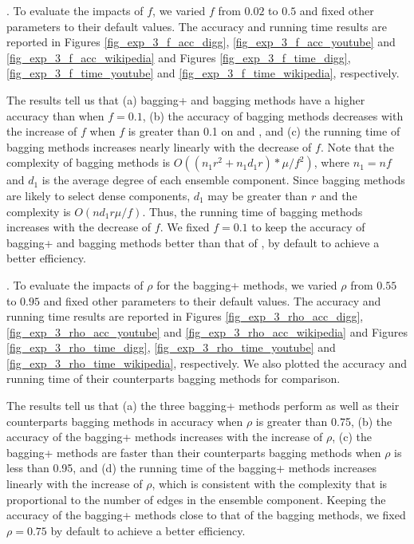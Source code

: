 . To evaluate the impacts of $f$, we
varied $f$ from $0.02$ to $0.5$ and fixed other parameters to their
default values. The accuracy and running time results are reported in
Figures \ref{fig_exp_3_f_acc_digg}, \ref{fig_exp_3_f_acc_youtube} and \ref{fig_exp_3_f_acc_wikipedia} and
Figures \ref{fig_exp_3_f_time_digg}, \ref{fig_exp_3_f_time_youtube} and \ref{fig_exp_3_f_time_wikipedia}, respectively.



The results tell us that (a) bagging+ and bagging methods have a higher accuracy
than \NMF when $f = 0.1$, (b) the accuracy of bagging methods decreases
with the increase of $f$ when $f$ is greater than 0.1 on \Digg and \Wikipedia,
and (c) the running time of bagging methods increases
nearly linearly with the decrease of $f$. Note that the complexity of bagging methods is
$O((n_{1}r^2 + n_{1}d_{1}r)*\mu /f^2)$, where $n_1 = nf$ and $d_1$ is the average degree of
each ensemble component. Since bagging methods are likely to select dense components, $d_1$
may be greater than $r$ and the complexity is $O(nd_1r\mu /f)$. Thus, the running time
of bagging methods increases with the decrease of $f$. We fixed $f = 0.1$ to keep the accuracy of bagging+ and bagging
methods better than that of \NMF, by default to achieve a better efficiency.




. To evaluate the impacts of $\rho$ for
the bagging+ methods, we varied $\rho$ from $0.55$ to $0.95$ and
fixed other parameters to their default values. The accuracy and
running time results are reported in
Figures \ref{fig_exp_3_rho_acc_digg}, \ref{fig_exp_3_rho_acc_youtube} and \ref{fig_exp_3_rho_acc_wikipedia} and
Figures \ref{fig_exp_3_rho_time_digg}, \ref{fig_exp_3_rho_time_youtube} and \ref{fig_exp_3_rho_time_wikipedia}, respectively.
We also plotted the accuracy and running time of their counterparts
bagging methods for comparison.

The results tell us that (a) the three bagging+ methods perform
as well as their counterparts bagging methods in accuracy when
$\rho$ is greater than 0.75, (b) the accuracy of the bagging+ methods
increases with the increase of $\rho$, (c) the bagging+ methods are faster
than their counterparts bagging methods when $\rho$ is less than 0.95,
and (d) the running time of the bagging+ methods increases linearly
with the increase of $\rho$, which is consistent with
the complexity that is proportional to the number of edges in the
ensemble component. Keeping the accuracy of the bagging+ methods close to
that of the bagging methods, we fixed $\rho = 0.75$ by default to achieve a better efficiency.



